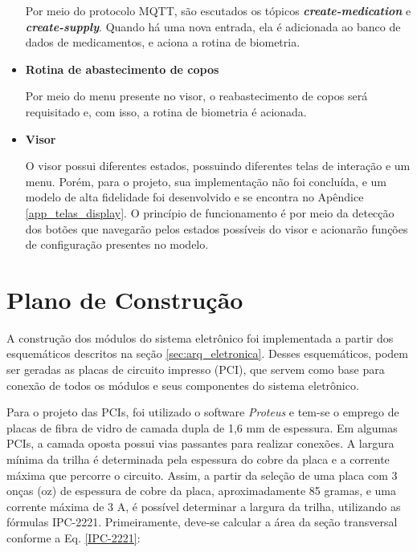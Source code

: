 \begin{itemize}
    Por meio do protocolo MQTT, são escutados os tópicos \textit{\textbf{create-medication}} e \textit{\textbf{create-supply}}. Quando há uma nova entrada, ela é adicionada ao banco de dados de medicamentos, e aciona a rotina de biometria.
    
    \item \textbf{Rotina de abastecimento de copos}
    
    Por meio do menu presente no visor, o reabastecimento de copos será requisitado e, com isso, a rotina de biometria é acionada.
    
    \item \textbf{Visor}
    
    O visor possui diferentes estados, possuindo diferentes telas de interação e um menu. Porém, para o projeto, sua implementação não foi concluída, e um modelo de alta fidelidade foi desenvolvido e se encontra no Apêndice  \ref{app_telas_display}. O princípio de funcionamento é por meio da detecção dos botões que navegarão pelos estados possíveis do visor e acionarão funções de configuração presentes no modelo.
    
\end{itemize}



\section{Plano de Construção}
\label{sec:plano_de_construção}

A construção dos módulos do sistema eletrônico foi implementada a partir dos esquemáticos descritos na seção \ref{sec:arq_eletronica}. Desses esquemáticos, podem ser geradas as placas de circuito impresso (PCI), que servem como base para conexão de todos os módulos e seus componentes do sistema eletrônico. 

Para o projeto das PCIs, foi utilizado o software \textit{Proteus} e tem-se o emprego de placas de fibra de vidro de camada dupla de 1,6 mm de espessura. Em algumas PCIs, a camada oposta possui vias passantes para realizar conexões. A largura mínima da trilha é determinada pela espessura do cobre da placa e a corrente máxima que percorre o circuito. Assim, a partir da seleção de uma placa com 3 onças (oz) de espessura de cobre da placa, aproximadamente 85 gramas, e uma corrente máxima de 3 A, é possível determinar a largura da trilha, utilizando as fórmulas IPC-2221. Primeiramente, deve-se calcular a área da seção transversal conforme a Eq. \ref{IPC-2221}:


